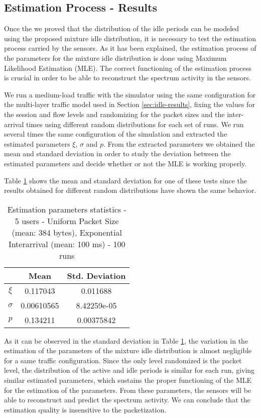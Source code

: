 \subsection{Estimation Process - Results} \label{sec:mle-results}
Once the we proved that the distribution of the idle periods can be modeled using the proposed mixture idle distribution, it is necessary to test the estimation process carried by the sensors. As it has been explained, the estimation process of the parameters for the mixture idle distribution is done using Maximum Likelihood Estimation (\acs{MLE}). The correct functioning of the estimation process is crucial in order to be able to reconstruct the spectrum activity in the sensors.

We run a medium-load traffic with the simulator using the same configuration for the multi-layer traffic model used in Section \ref{sec:idle-results}, fixing the values for the session and flow levels and randomizing for the packet sizes and the inter-arrival times using different random distributions for each set of runs. We run several times the same configuration of the simulation and extracted the estimated parameters $\xi$, $\sigma$ and $p$. From the extracted parameters we obtained the mean and standard deviation in order to study the deviation between the estimated parameters and decide whether or not the \acs{MLE} is working properly.

Table \ref{table:MLE} shows the mean and standard deviation for one of these tests since the results obtained for different random distributions have shown the same behavior.

\begin{table}[h!]
	\centering
	\begin{tabular}{ c | c | c }
		& Mean & Std. Deviation \\ \hline
		$\xi$ & 0.117043 & 0.011688 \\ 
		$\sigma$ & 0.00610565 & 8.42259e-05 \\
		$p$ & 0.134211 & 0.00375842 \\
	\end{tabular}
	\caption{Estimation parameters statistics - 5 users - Uniform Packet Size (mean: 384 bytes), Exponential Interarrival (mean: 100 ms) - 100 runs}
	\label{table:MLE}
\end{table}

As it can be observed in the standard deviation in Table \ref{table:MLE}, the variation in the estimation of the parameters of the mixture idle distribution is almost negligible for a same traffic configuration. Since the only level randomized is the packet level, the distribution of the active and idle periods is similar for each run, giving similar estimated parameters, which sustains the proper functioning of the \acs{MLE} for the estimation of the parameters. From these parameters, the sensors will be able to reconstruct and predict the spectrum activity. We can conclude that the estimation quality is insensitive to the packetization.